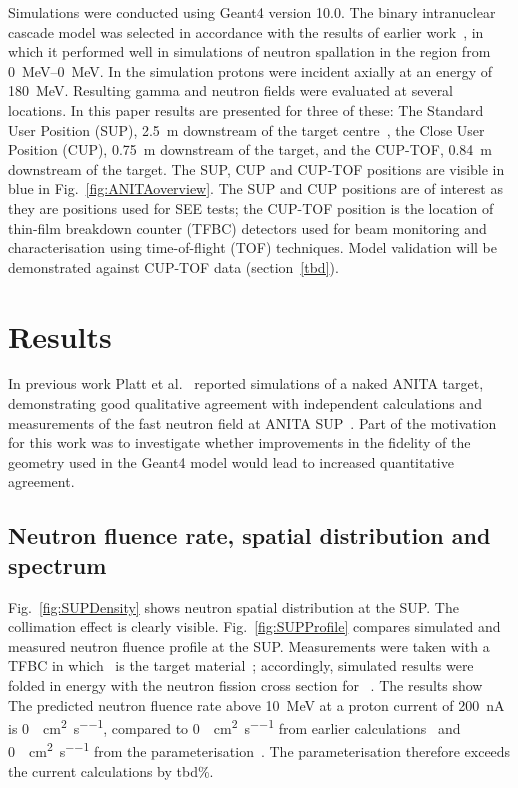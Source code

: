 \documentclass[11pt,a4paper]{IEEEtran}
\def\U238{\BPChem{\^{238}U}}
\begin{document}
Simulations were conducted using Geant4 version 10.0.
The binary intranuclear cascade model was selected in accordance with the results of earlier work~\cite{Platt13}, in which it performed well in simulations of neutron spallation in the region from \SIrange{0}{0}{\MeV}.
In the simulation protons were incident axially at an energy of \SI{180}{\MeV}.
Resulting gamma and neutron fields were evaluated at several locations.
In this paper results are presented for three of these: The Standard User Position (SUP), \SI{2.5}{\m} downstream of the target centre~\cite{Prokofiev2009}, the Close User Position (CUP), \SI{0.75}{\m} downstream of the target, and the CUP-TOF, \SI{0.84}{m} downstream of the target.
The SUP, CUP and CUP-TOF positions are visible in blue in Fig.~\ref{fig:ANITAoverview}.
The SUP and CUP positions are of interest as they are positions used for SEE tests; the CUP-TOF position is the location of thin-film breakdown counter (TFBC) detectors used for beam monitoring and characterisation using time-of-flight (TOF) techniques.
Model validation will be demonstrated against CUP-TOF data (section~\ref{tbd}).

\section{Results}

In previous work Platt et al.~\cite{Platt13} reported simulations of a naked ANITA target, demonstrating good qualitative agreement with independent calculations and measurements of the fast neutron field at ANITA SUP~\cite{Prokofiev2009}.
Part of the motivation for this work was to investigate whether improvements in the fidelity of the geometry used in the Geant4 model would lead to increased quantitative agreement.

\subsection{Neutron fluence rate, spatial distribution and spectrum}

Fig.~\ref{fig:SUPDensity} shows neutron spatial distribution at the SUP.
The collimation effect is clearly visible.
Fig.~\ref{fig:SUPProfile} compares simulated and measured neutron fluence profile at the SUP.
Measurements were taken with a TFBC in which \U238\ is the target material~\cite{Prokofiev2009}; accordingly, simulated results were folded in energy with the neutron fission cross section for \U238~\cite{tbd}.
The results show~
The predicted neutron fluence rate above \SI{10}{\MeV} at a proton current of \SI{200}{\nA} is \SI{0}{\neutron\per\cm\squared\per\second}, compared to \SI{0}{\neutron\per\cm\squared\per\second} from earlier calculations~\cite{Platt13} and \SI{0}{\neutron\per\cm\squared\per\second} from the parameterisation~\cite{Prokofiev2009}.
The parameterisation therefore exceeds the current calculations by tbd\%.
\end{document}
